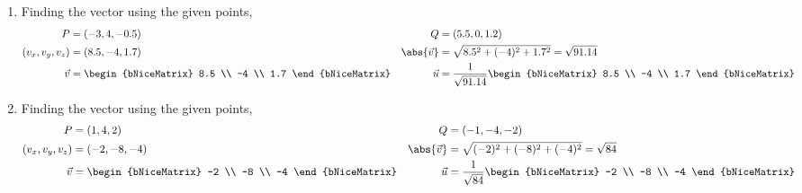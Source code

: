 \begin{enumerate}
    \item Finding the vector using the given points,
          \begin{align}
              P                     & = (-3, 4, -0.5)                                &
              Q                     & = (5.5, 0, 1.2)                                  \\
              (v_x, v_y, v_z)       & = (8.5, -4, 1.7)                               &
              \abs{ \vec{v} } & = \sqrt{8.5^2 + (-4)^2 + 1.7^2} = \sqrt{91.14}   \\
              \vec{v}               & = \begin{bNiceMatrix}
                                            8.5 \\ -4 \\ 1.7
                                        \end{bNiceMatrix}                          &
              \vec{u}               & = \frac{1}{\sqrt{91.14}}\begin{bNiceMatrix}
                                                                  8.5 \\ -4 \\ 1.7
                                                              \end{bNiceMatrix}
          \end{align}

    \item Finding the vector using the given points,
          \begin{align}
              P                     & = (1, 4, 2)                              &
              Q                     & = (-1, -4, -2)                             \\
              (v_x, v_y, v_z)       & = (-2, -8, -4)                           &
              \abs{ \vec{v} } & = \sqrt{(-2)^2 + (-8)^2 + (-4)^2}
              = \sqrt{84}                                                        \\
              \vec{v}               & = \begin{bNiceMatrix}
                                            -2 \\ -8 \\ -4
                                        \end{bNiceMatrix}                    &
              \vec{u}               & = \frac{1}{\sqrt{84}}\begin{bNiceMatrix}
                                                               -2 \\ -8 \\ -4
                                                           \end{bNiceMatrix}
          \end{align}


\end{enumerate}
